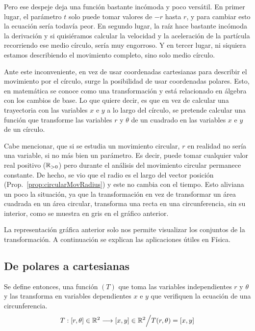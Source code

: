 \documentclass[a5paper,12pt,twoside]{book}
\begin{document}
Pero ese despeje deja una función bastante incómoda y poco versátil.
En primer lugar, el parámetro $t$ solo puede tomar valores de $-r$ hasta $r$, y para cambiar esto la ecuación sería todavía peor.
En segundo lugar, la raíz hace bastante incómoda la derivación y si quisiéramos calcular la velocidad y la aceleración de la partícula recorriendo ese medio círculo, sería muy engorroso.
Y en tercer lugar, ni siquiera estamos describiendo el movimiento completo, sino solo medio círculo.

Ante este inconveniente, en vez de usar coordenadas cartesianas para describir el movimiento por el círculo, surge la posibilidad de usar coordenadas polares.
Esto, en matemática se conoce como una transformación y está relacionado en álgebra con los cambios de base.
Lo que quiere decir, es que en vez de calcular una trayectoria con las variables $x$ e $y$ a lo largo del círculo, se pretende calcular una función que transforme las variables $r$ y $\theta$ de un cuadrado en las variables $x$ e $y$ de un círculo.

\begin{center}
    \def\svgwidth{\linewidth}
    
\end{center}

Cabe mencionar, que si se estudia un movimiento circular, $r$ en realidad no sería una variable, si no más bien un parámetro.
Es decir, puede tomar cualquier valor real positivo ($\mathbb{R}_{> 0}$) pero durante el análisis del movimiento circular permanece constante.
De hecho, se vio que el radio es el largo del vector posición (Prop.\ \ref{prop:circularMovRadius}) y este no cambia con el tiempo.
Esto aliviana un poco la situación, ya que la transformación en vez de transformar un área cuadrada en un área circular, transforma una recta en una circunferencia, sin su interior, como se muestra en gris en el gráfico anterior.

La representación gráfica anterior solo nos permite visualizar los conjuntos de la transformación.
A continuación se explican las aplicaciones útiles en Física.

\subsection{De polares a cartesianas}

Se define entonces, una función $(T)$ que toma las variables independientes $r$ y $\theta$ y las transforma en variables dependientes $x$ e $y$ que verifiquen la ecuación de una circunferencia.
\[
    T:[r,\theta] \in \mathbb{R}^2 \longrightarrow [x,y] \in \mathbb{R}^2 \Big/
    T(r,\theta) = [x,y]
\]
\end{document}
